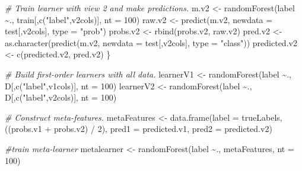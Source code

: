 \documentclass[
  11pt,
]{krantz}
\newenvironment{Shaded}{\begin{snugshade}}{\end{snugshade}}
\newcommand{\AttributeTok}[1]{\textcolor[rgb]{0.61,0.61,0.61}{#1}}
\newcommand{\CommentTok}[1]{\textcolor[rgb]{0.37,0.37,0.37}{\textit{#1}}}
\newcommand{\DecValTok}[1]{\textcolor[rgb]{0.06,0.06,0.06}{#1}}
\newcommand{\FunctionTok}[1]{\textcolor[rgb]{0,0,0}{#1}}
\newcommand{\NormalTok}[1]{#1}
\newcommand{\OtherTok}[1]{\textcolor[rgb]{0.37,0.37,0.37}{#1}}
\newcommand{\SpecialCharTok}[1]{\textcolor[rgb]{0,0,0}{#1}}
\newcommand{\StringTok}[1]{\textcolor[rgb]{0.5,0.5,0.5}{#1}}
\begin{document}
\begin{Shaded}
\begin{Highlighting}[]
    \CommentTok{\# Train learner with view 2 and make predictions.}
\NormalTok{    m.v2 }\OtherTok{\textless{}{-}} \FunctionTok{randomForest}\NormalTok{(label }\SpecialCharTok{\textasciitilde{}}\NormalTok{.,}
\NormalTok{                         train[,}\FunctionTok{c}\NormalTok{(}\StringTok{"label"}\NormalTok{,v2cols)], }\AttributeTok{nt =} \DecValTok{100}\NormalTok{)}
\NormalTok{    raw.v2 }\OtherTok{\textless{}{-}} \FunctionTok{predict}\NormalTok{(m.v2, }\AttributeTok{newdata =}\NormalTok{ test[,v2cols], }\AttributeTok{type =} \StringTok{"prob"}\NormalTok{)}
\NormalTok{    probs.v2 }\OtherTok{\textless{}{-}} \FunctionTok{rbind}\NormalTok{(probs.v2, raw.v2)}
\NormalTok{    pred.v2 }\OtherTok{\textless{}{-}} \FunctionTok{as.character}\NormalTok{(}\FunctionTok{predict}\NormalTok{(m.v2,}
                                    \AttributeTok{newdata =}\NormalTok{ test[,v2cols],}
                                    \AttributeTok{type =} \StringTok{"class"}\NormalTok{))}
\NormalTok{    predicted.v2 }\OtherTok{\textless{}{-}} \FunctionTok{c}\NormalTok{(predicted.v2, pred.v2)}
\NormalTok{  \}}
  
  \CommentTok{\# Build first{-}order learners with all data.}
\NormalTok{  learnerV1 }\OtherTok{\textless{}{-}} \FunctionTok{randomForest}\NormalTok{(label }\SpecialCharTok{\textasciitilde{}}\NormalTok{.,}
\NormalTok{                            D[,}\FunctionTok{c}\NormalTok{(}\StringTok{"label"}\NormalTok{,v1cols)], }\AttributeTok{nt =} \DecValTok{100}\NormalTok{)}
\NormalTok{  learnerV2 }\OtherTok{\textless{}{-}} \FunctionTok{randomForest}\NormalTok{(label }\SpecialCharTok{\textasciitilde{}}\NormalTok{.,}
\NormalTok{                            D[,}\FunctionTok{c}\NormalTok{(}\StringTok{"label"}\NormalTok{,v2cols)], }\AttributeTok{nt =} \DecValTok{100}\NormalTok{)}
    
  \CommentTok{\# Construct meta{-}features.}
\NormalTok{  metaFeatures }\OtherTok{\textless{}{-}} \FunctionTok{data.frame}\NormalTok{(}\AttributeTok{label =}\NormalTok{ trueLabels,}
\NormalTok{                             ((probs.v1 }\SpecialCharTok{+}\NormalTok{ probs.v2) }\SpecialCharTok{/} \DecValTok{2}\NormalTok{),}
                             \AttributeTok{pred1 =}\NormalTok{ predicted.v1,}
                             \AttributeTok{pred2 =}\NormalTok{ predicted.v2)}

  \CommentTok{\#train meta{-}learner}
\NormalTok{  metalearner }\OtherTok{\textless{}{-}} \FunctionTok{randomForest}\NormalTok{(label }\SpecialCharTok{\textasciitilde{}}\NormalTok{.,}
\NormalTok{                              metaFeatures, }\AttributeTok{nt =} \DecValTok{100}\NormalTok{)}
  

\end{Highlighting}
\end{Shaded}
\end{document}
